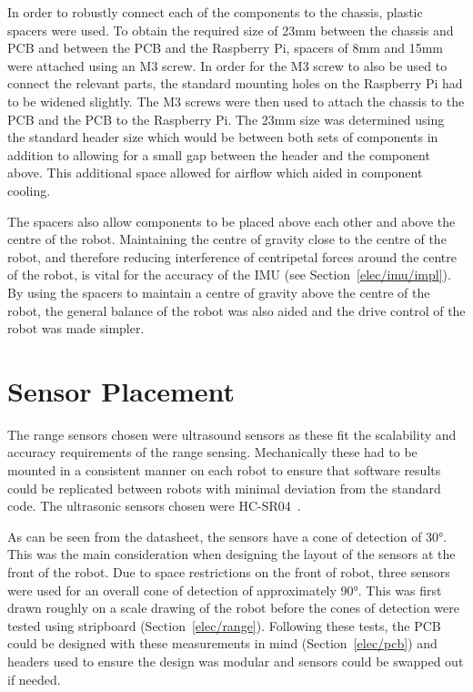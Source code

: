 In order to robustly connect each of the components to the 
chassis, plastic spacers were used. To obtain the required size 
of 23mm between the chassis and PCB 
and between the PCB and the Raspberry Pi, spacers of 8mm and 15mm 
were attached using an M3 screw. In order for the M3 screw to also 
be used to connect the relevant parts, the standard mounting holes 
on the Raspberry Pi had to be widened slightly. The M3 screws were 
then used to attach the chassis to the PCB and the PCB to the 
Raspberry Pi. The 23mm size was determined using the standard 
header size which would be between both sets of components in 
addition to allowing for a small gap between the header and the 
component above. This additional space allowed for airflow which 
aided in component cooling. 

The spacers also allow components to be placed above each other 
and above the centre of the robot. Maintaining the centre of 
gravity close to the centre of the robot, and therefore reducing 
interference of centripetal forces around the centre of the robot, 
is vital for the accuracy of the IMU (see Section~\ref{elec/imu/impl}). By using 
the spacers to maintain a centre of gravity above the centre of the 
robot, the general balance of the robot was also aided and the drive 
control of the robot was made simpler.    

\section{Sensor Placement}\label{mech/sensors}
The range sensors chosen were ultrasound sensors as these fit the
scalability and accuracy requirements of the range sensing. 
Mechanically these had to be mounted in a consistent manner on each 
robot to ensure that software results could be replicated between 
robots with minimal deviation from the standard code. The ultrasonic 
sensors chosen were HC-SR04~\cite{HCSR04datasheet}.

As can be seen from the datasheet, the sensors have a cone of 
detection of \ang{30}. This was the main consideration when designing 
the layout of the sensors at the front of the robot. Due to space 
restrictions on the front of robot, three sensors were used for an 
overall cone of detection of approximately \ang{90}. This was first 
drawn roughly on a scale drawing of the robot before the cones of 
detection were tested using stripboard (Section~\ref{elec/range}). 
Following these tests, the PCB could be designed with these measurements 
in mind (Section~\ref{elec/pcb}) and headers used to ensure the design 
was modular and sensors could be swapped out if needed. 

